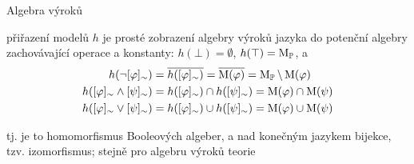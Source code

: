 \documentclass{beamer}
\begin{document}
\begin{frame}{Algebra výroků}


    \pause
    přiřazení modelů $h$ je prosté zobrazení algebry výroků jazyka do \alert{potenční algebry}  \alert{zachovávající} operace a konstanty: $h(\bot)=\emptyset$, $h(\top)=\operatorname{M}_\mathbb P$, a
    {\small
    \begin{align*}
        h(\neg[\varphi]_\sim)&=\overline{h([\varphi]_\sim)}=\overline{\operatorname{M}(\varphi)}=\operatorname{M}_\mathbb P\setminus\operatorname{M}(\varphi)\\
        h([\varphi]_\sim\land[\psi]_\sim)&=h([\varphi]_\sim)\cap h([\psi]_\sim)=\operatorname{M}(\varphi)\cap\operatorname{M}(\psi)\\
        h([\varphi]_\sim\lor[\psi]_\sim)&=h([\varphi]_\sim)\cup h([\psi]_\sim)=\operatorname{M}(\varphi)\cup\operatorname{M}(\psi)
    \end{align*}
    }

    \vspace{-6pt}

    tj. je to  \alert{homomorfismus} Booleových algeber, a nad konečným jazykem bijekce, tzv. \alert{izomorfismus}; stejně pro algebru výroků teorie

    \pause

\end{frame}
\end{document}
